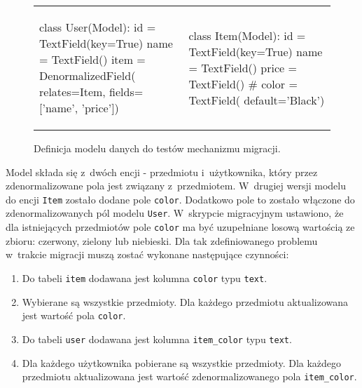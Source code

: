 \begin{figure}[ht!]
	\centering

	\begin{tabular}{p{7cm} p{7cm}}
		\begin{verbbox}[\footnotesize]
			class User(Model):
			    id = TextField(key=True)
			    name = TextField()
			    item = DenormalizedField(
			        relates=Item,
			        fields=['name', 'price'])
		\end{verbbox}

		\theverbbox & 

		\begin{verbbox}[\footnotesize]
			class Item(Model):
			    id = TextField(key=True)
			    name = TextField()
			    price = TextField()
			    # color = TextField(
			    	default='Black')
		\end{verbbox}

		\theverbbox \\
	\end{tabular}

	\caption{Definicja modelu danych do testów mechanizmu migracji.}
	\label{vrb:migrations_data_model_for_tests}
\end{figure}

Model składa się z~dwóch encji - przedmiotu i~użytkownika, który przez zdenormalizowane pola jest związany z~przedmiotem. W~drugiej wersji modelu do encji \verb+Item+ zostało dodane pole \verb+color+. Dodatkowo pole to zostało włączone do zdenormalizowanych pól modelu \verb+User+. W~skrypcie migracyjnym ustawiono, że dla istniejących przedmiotów pole \verb+color+ ma być uzupełniane losową wartością ze zbioru: czerwony, zielony lub niebieski. Dla tak zdefiniowanego problemu w~trakcie migracji muszą zostać wykonane następujące czynności:

\begin{enumerate}
	\item Do tabeli \verb+item+ dodawana jest kolumna \verb+color+ typu \verb+text+.
	\item Wybierane są wszystkie przedmioty. Dla każdego przedmiotu aktualizowana jest wartość pola \verb+color+.
	\item Do tabeli \verb+user+ dodawana jest kolumna \verb+item_color+ typu \verb+text+.
	\item Dla każdego użytkownika pobierane są wszystkie przedmioty. Dla każdego przedmiotu aktualizowana jest wartość zdenormalizowanego pola \verb+item_color+.
\end{enumerate}

